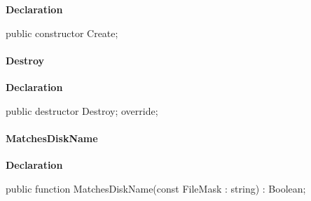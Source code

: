 \documentclass{report}
\newif\ifpdf
\begin{document}
\label{AbArcTyp.TAbArchiveItem-Create}
\begin{list}{}{
\setlength{\itemindent}{0cm}
\setlength{\listparindent}{0cm}
\setlength{\leftmargin}{\evensidemargin}
\addtolength{\leftmargin}{\tmplength}
\settowidth{\labelsep}{X}
\addtolength{\leftmargin}{\labelsep}
\setlength{\labelwidth}{\tmplength}
}
\item[\textbf{Declaration}\hfill]
\ifpdf
\begin{flushleft}
\fi
\begin{ttfamily}
public constructor Create;\end{ttfamily}

\ifpdf
\end{flushleft}
\fi

\end{list}
\paragraph*{Destroy}\hspace*{\fill}

\label{AbArcTyp.TAbArchiveItem-Destroy}
\begin{list}{}{
\setlength{\itemindent}{0cm}
\setlength{\listparindent}{0cm}
\setlength{\leftmargin}{\evensidemargin}
\addtolength{\leftmargin}{\tmplength}
\settowidth{\labelsep}{X}
\addtolength{\leftmargin}{\labelsep}
\setlength{\labelwidth}{\tmplength}
}
\item[\textbf{Declaration}\hfill]
\ifpdf
\begin{flushleft}
\fi
\begin{ttfamily}
public destructor Destroy; override;\end{ttfamily}

\ifpdf
\end{flushleft}
\fi

\end{list}
\paragraph*{MatchesDiskName}\hspace*{\fill}

\label{AbArcTyp.TAbArchiveItem-MatchesDiskName}
\begin{list}{}{
\setlength{\itemindent}{0cm}
\setlength{\listparindent}{0cm}
\setlength{\leftmargin}{\evensidemargin}
\addtolength{\leftmargin}{\tmplength}
\settowidth{\labelsep}{X}
\addtolength{\leftmargin}{\labelsep}
\setlength{\labelwidth}{\tmplength}
}
\item[\textbf{Declaration}\hfill]
\ifpdf
\begin{flushleft}
\fi
\begin{ttfamily}
public function MatchesDiskName(const FileMask : string) : Boolean;\end{ttfamily}

\ifpdf
\end{flushleft}
\fi

\end{list}
\end{document}
